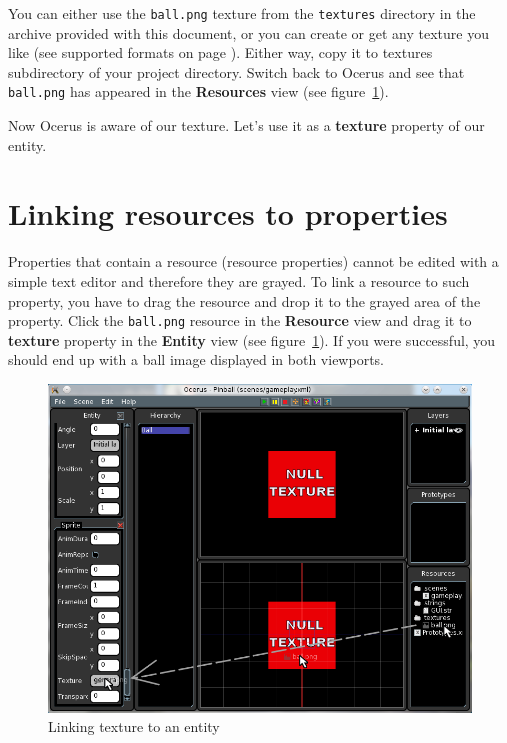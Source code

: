 \documentclass[a4paper,12pt]{article}
\begin{document}
You can either use the \texttt{ball.png} texture from the \texttt{textures} directory in the archive provided with this document, or you can create or get any texture you like (see supported formats on page \pageref{sec:supported_formats}). Either way, copy it to textures subdirectory of your project directory. Switch back to Ocerus and see that \texttt{ball.png} has appeared in the \textbf{Resources} view (see figure~\ref{fig:link_texture}).

Now Ocerus is aware of our texture. Let's use it as a \textbf{texture} property of our entity.

\section{Linking resources to properties}
Properties that contain a resource (resource properties) cannot be edited with a simple text editor and therefore they are grayed. To link a resource to such property, you have to drag the resource and drop it to the grayed area of the property. Click the \texttt{ball.png} resource in the \textbf{Resource} view and drag it to \textbf{texture} property in the \textbf{Entity} view (see figure~\ref{fig:link_texture}). If you were successful, you should end up with a ball image displayed in both viewports.

\begin{figure}[ht]
 \begin{center}
  \includegraphics[width=\textwidth]{LinkTexture}
 \end{center}
 \caption{Linking texture to an entity}
 \label{fig:link_texture}
\end{figure}
\end{document}
